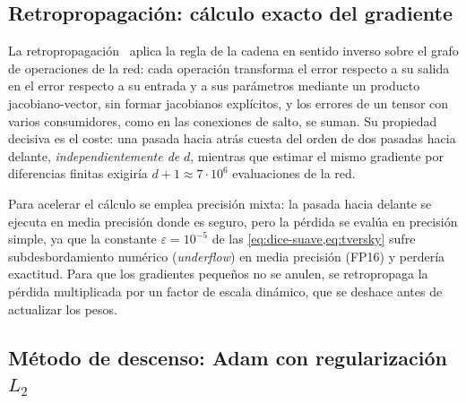 \subsection{Retropropagación: cálculo exacto del gradiente}\label{subsec:retropropagacion}

La retropropagación~\cite{rumelhart1986backprop} aplica la regla de la cadena en sentido inverso sobre el grafo de operaciones de la red: cada operación transforma el error respecto a su salida en el error respecto a su entrada y a sus parámetros mediante un producto jacobiano-vector, sin formar jacobianos explícitos, y los errores de un tensor con varios consumidores, como en las conexiones de salto, se suman. Su propiedad decisiva es el coste: una pasada hacia atrás cuesta del orden de dos pasadas hacia delante, \emph{independientemente de} $d$, mientras que estimar el mismo gradiente por diferencias finitas exigiría $d+1\approx7\cdot10^{6}$ evaluaciones de la red.

Para acelerar el cálculo se emplea precisión mixta: la pasada hacia delante se ejecuta en media precisión donde es seguro, pero la pérdida se evalúa en precisión simple, ya que la constante $\varepsilon=10^{-5}$ de las \cref{eq:dice-suave,eq:tversky} sufre subdesbordamiento numérico (\textit{underflow}) en media precisión (FP16) y perdería exactitud. Para que los gradientes pequeños no se anulen, se retropropaga la pérdida multiplicada por un factor de escala dinámico, que se deshace antes de actualizar los pesos.

\subsection{Método de descenso: Adam con regularización \texorpdfstring{$L_2$}{L2}}\label{subsec:adam}

